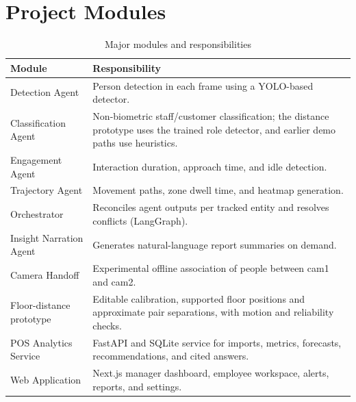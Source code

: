 \section{Project Modules}
\begin{table}[H]
\centering
\caption{Major modules and responsibilities}
\begin{tabular}{P{0.25\textwidth}P{0.65\textwidth}}
\toprule
Module & Responsibility\\
\midrule
Detection Agent & Person detection in each frame using a YOLO-based detector.\\
Classification Agent & Non-biometric staff/customer classification; the distance prototype uses the trained role detector, and earlier demo paths use heuristics.\\
Engagement Agent & Interaction duration, approach time, and idle detection.\\
Trajectory Agent & Movement paths, zone dwell time, and heatmap generation.\\
Orchestrator & Reconciles agent outputs per tracked entity and resolves conflicts (LangGraph).\\
Insight Narration Agent & Generates natural-language report summaries on demand.\\
Camera Handoff & Experimental offline association of people between cam1 and cam2.\\
Floor-distance prototype & Editable calibration, supported floor positions and approximate pair separations, with motion and reliability checks.\\
POS Analytics Service & FastAPI and SQLite service for imports, metrics, forecasts, recommendations, and cited answers.\\
Web Application & Next.js manager dashboard, employee workspace, alerts, reports, and settings.\\
\bottomrule
\end{tabular}
\end{table}


